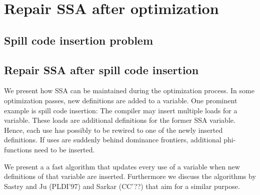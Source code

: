 \chapter{Repair SSA after optimization }

\section{Spill code insertion problem}
\section{Repair SSA after spill code insertion}
We present how SSA can be maintained during the optimization process. 
In some optimization passes, new definitions are added to a variable.
One prominent example is spill code insertion:
The compiler may insert multiple loads for a variable.
These loads are additional definitions for the former SSA variable.
Hence, each use has possibly to be rewired to one of the newly inserted definitions.
If uses are suddenly behind dominance frontiers, additional phi-functions need to be inserted.

We present a a fast algorithm that updates every use of a variable when new definitions of that variable are inserted.
Furthermore we discuss the algorithms by Sastry and Ju (PLDI'97) and Sarkar (CC'??) that aim for a similar purpose.

